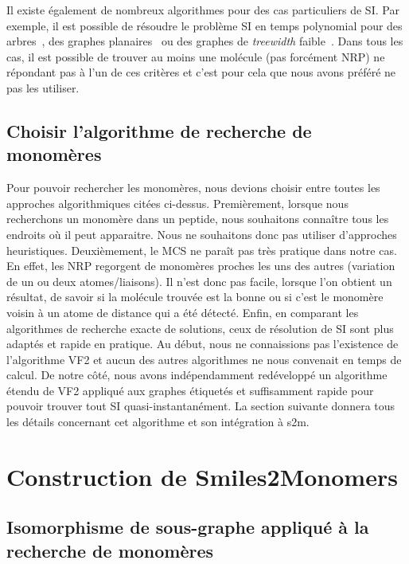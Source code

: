 Il existe également de nombreux algorithmes pour des cas particuliers de SI.
Par exemple, il est possible de résoudre le problème SI en temps polynomial pour des arbres~\cite{shamir_faster_1997}, des graphes planaires~\cite{eppstein_subgraph_1995,dorn_planar_2009} ou des graphes de \textit{treewidth} faible~\cite{hajiaghayi_subgraph_2007}.
Dans tous les cas, il est possible de trouver au moins une molécule (pas forcément NRP) ne répondant pas à l'un de ces critères et c'est pour cela que nous avons préféré ne pas les utiliser.


\subsection{Choisir l'algorithme de recherche de monomères}

Pour pouvoir rechercher les monomères, nous devions choisir entre toutes les approches algorithmiques citées ci-dessus.
Premièrement, lorsque nous recherchons un monomère dans un peptide, nous souhaitons connaître tous les endroits où il peut apparaitre.
Nous ne souhaitons donc pas utiliser d'approches heuristiques.
Deuxièmement, le MCS ne paraît pas très pratique dans notre cas.
En effet, les NRP regorgent de monomères proches les uns des autres (variation de un ou deux atomes/liaisons).
Il n'est donc pas facile, lorsque l'on obtient un résultat, de savoir si la molécule trouvée est la bonne ou si c'est le monomère voisin à un atome de distance qui a été détecté.
Enfin, en comparant les algorithmes de recherche exacte de solutions, ceux de résolution de SI sont plus adaptés et rapide en pratique.
Au début, nous ne connaissions pas l'existence de l'algorithme VF2 et aucun des autres algorithmes ne nous convenait en temps de calcul.
De notre côté, nous avons indépendamment redéveloppé un algorithme étendu de VF2 appliqué aux graphes étiquetés et suffisamment rapide pour pouvoir trouver tout SI quasi-instantanément.
La section suivante donnera tous les détails concernant cet algorithme et son intégration à s2m.




\section{Construction de Smiles2Monomers}

\label{algos_s2m}

\subsection{Isomorphisme de sous-graphe appliqué à la recherche de monomères}

